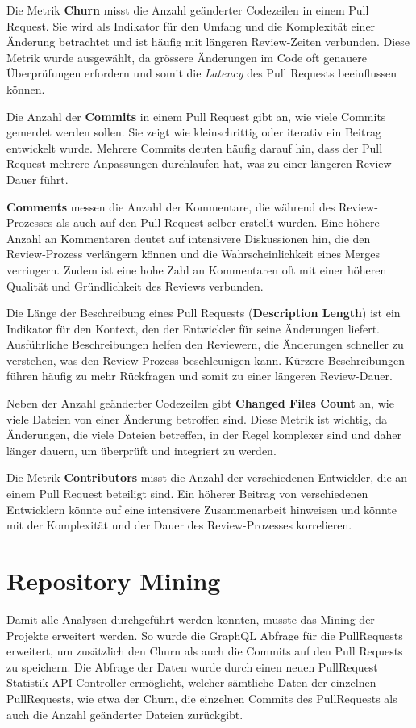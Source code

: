 Die Metrik \textbf{Churn} misst die Anzahl geänderter Codezeilen in einem Pull Request. Sie wird als Indikator für den Umfang und die Komplexität einer Änderung betrachtet und ist häufig mit längeren Review-Zeiten verbunden. Diese Metrik wurde ausgewählt, da grössere Änderungen im Code oft genauere Überprüfungen erfordern und somit die \textit{Latency} des Pull Requests beeinflussen können. \parencite{gousios_exploratory_2014}

Die Anzahl der \textbf{Commits} in einem Pull Request gibt an, wie viele Commits gemerdet werden sollen. Sie zeigt wie kleinschrittig oder iterativ ein Beitrag entwickelt wurde. Mehrere Commits deuten häufig darauf hin, dass der Pull Request mehrere Anpassungen durchlaufen hat, was zu einer längeren Review-Dauer führt. \parencite{zhang_pull_2022}

\textbf{Comments} messen die Anzahl der Kommentare, die während des Review-Prozesses als auch auf den Pull Request selber erstellt wurden. Eine höhere Anzahl an Kommentaren deutet auf intensivere Diskussionen hin, die den Review-Prozess verlängern können und die Wahrscheinlichkeit eines Merges verringern. Zudem ist eine hohe Zahl an Kommentaren oft mit einer höheren Qualität und Gründlichkeit des Reviews verbunden. \parencite{tsay_influence_2014}

Die Länge der Beschreibung eines Pull Requests (\textbf{Description Length}) ist ein Indikator für den Kontext, den der Entwickler für seine Änderungen liefert. Ausführliche Beschreibungen helfen den Reviewern, die Änderungen schneller zu verstehen, was den Review-Prozess beschleunigen kann. Kürzere Beschreibungen führen häufig zu mehr Rückfragen und somit zu einer längeren Review-Dauer. \parencite{zhang_pull_2022}

Neben der Anzahl geänderter Codezeilen gibt \textbf{Changed Files Count} an, wie viele Dateien von einer Änderung betroffen sind. Diese Metrik ist wichtig, da Änderungen, die viele Dateien betreffen, in der Regel komplexer sind und daher länger dauern, um überprüft und integriert zu werden. \parencite{tsay_influence_2014}

Die Metrik \textbf{Contributors} misst die Anzahl der verschiedenen Entwickler, die an einem Pull Request beteiligt sind. Ein höherer Beitrag von verschiedenen Entwicklern könnte auf eine intensivere Zusammenarbeit hinweisen und könnte mit der Komplexität und der Dauer des Review-Prozesses korrelieren.


\section{Repository Mining}
Damit alle Analysen durchgeführt werden konnten, musste das Mining der Projekte erweitert werden. So wurde die GraphQL Abfrage für die PullRequests erweitert, um zusätzlich den Churn als auch die Commits auf den Pull Requests zu speichern. Die Abfrage der Daten wurde durch einen neuen PullRequest Statistik API Controller ermöglicht, welcher sämtliche Daten der einzelnen PullRequests, wie etwa der Churn, die einzelnen Commits des PullRequests als auch die Anzahl geänderter Dateien zurückgibt. 

